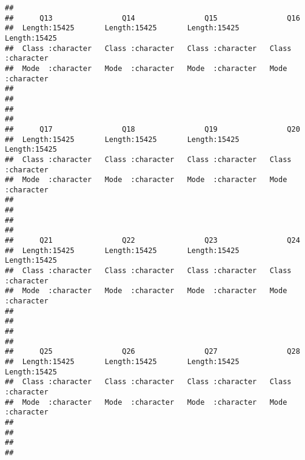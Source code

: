 \documentclass[
]{article}
\begin{document}
\begin{verbatim}
##                                                                             
##      Q13                Q14                Q15                Q16           
##  Length:15425       Length:15425       Length:15425       Length:15425      
##  Class :character   Class :character   Class :character   Class :character  
##  Mode  :character   Mode  :character   Mode  :character   Mode  :character  
##                                                                             
##                                                                             
##                                                                             
##                                                                             
##      Q17                Q18                Q19                Q20           
##  Length:15425       Length:15425       Length:15425       Length:15425      
##  Class :character   Class :character   Class :character   Class :character  
##  Mode  :character   Mode  :character   Mode  :character   Mode  :character  
##                                                                             
##                                                                             
##                                                                             
##                                                                             
##      Q21                Q22                Q23                Q24           
##  Length:15425       Length:15425       Length:15425       Length:15425      
##  Class :character   Class :character   Class :character   Class :character  
##  Mode  :character   Mode  :character   Mode  :character   Mode  :character  
##                                                                             
##                                                                             
##                                                                             
##                                                                             
##      Q25                Q26                Q27                Q28           
##  Length:15425       Length:15425       Length:15425       Length:15425      
##  Class :character   Class :character   Class :character   Class :character  
##  Mode  :character   Mode  :character   Mode  :character   Mode  :character  
##                                                                             
##                                                                             
##                                                                             
##                                                                             

\end{verbatim}
\end{document}
